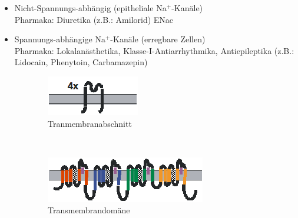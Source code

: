 \documentclass[10pt,a4paper]{report}
\begin{document}
\begin{itemize}
	\item Nicht-Spannungs-abhängig (epitheliale Na$^+$-Kanäle)\\
	Pharmaka: Diuretika (z.B.: Amilorid) ENac	                       
	\item Spannungs-abhängige Na$^+$-Kanäle (erregbare Zellen)\\
		Pharmaka: Lokalanästhetika, Klasse-I-Antiarrhythmika, Antiepileptika (z.B.: Lidocain, Phenytoin, Carbamazepin)
\end{itemize}

\begin{figure}
    \centering
    \begin{subfigure}[b]{0.3\textwidth}
        \includegraphics[width=\textwidth]{Bilder/transmembran.png}
        \caption{Tranmembranabschnitt}
        \label{fig:transmembranna}
    \end{subfigure}
    ~ %
    \begin{subfigure}[b]{0.5\textwidth}
        \includegraphics[width=\textwidth]{Bilder/kanalaufbau2.png}
        \caption{Transmembrandomäne}
        \label{fig:transmebrandomaene}
    \end{subfigure}
    ~ %
    \begin{subfigure}[b]{0.1\textwidth}

\end{subfigure}
\end{figure}
\end{document}
